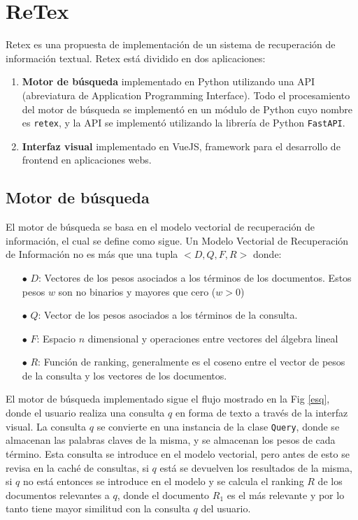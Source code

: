 \section{ReTex}

Retex es una propuesta de implementación de un sistema de recuperación de información textual. Retex está dividido en dos aplicaciones: 

\begin{enumerate}
    \item \textbf{Motor de búsqueda} implementado en Python utilizando una API (abreviatura de Application Programming Interface). Todo el procesamiento del motor de búsqueda se implementó en un módulo de Python cuyo nombre es \verb|retex|, y la API se implementó utilizando la librería de Python \verb|FastAPI|.
    \item \textbf{Interfaz visual} implementado en VueJS, framework para el desarrollo de frontend en aplicaciones webs.
\end{enumerate}

\subsection{Motor de búsqueda}

El motor de búsqueda se basa en el modelo vectorial de recuperación de información, el cual se define como sigue. Un Modelo Vectorial de Recuperación de Información \cite{manning} no es más que una tupla $<D, Q, F, R>$ donde:

\begin{enumerate}
    \item[$\bullet$] $D$: Vectores de los pesos asociados a los términos  de los documentos. Estos pesos $w$ son no binarios y mayores que cero ($w > 0$)
    \item[$\bullet$] $Q$: Vector de los pesos asociados a los términos de la consulta.
    \item[$\bullet$] $F$: Espacio $n$ dimensional y operaciones entre vectores del álgebra lineal
    \item[$\bullet$] $R$: Función de ranking, generalmente es el coseno entre el vector de pesos de la consulta y los vectores de los documentos.
\end{enumerate}

El motor de búsqueda implementado sigue el flujo mostrado en la Fig \ref{esq}, donde el usuario realiza una consulta $q$ en forma de texto a través de la interfaz visual. La consulta $q$ se convierte en una instancia de la clase \verb|Query|, donde se almacenan las palabras claves de la misma, y se almacenan los pesos de cada término. Esta consulta se introduce en el modelo vectorial, pero antes de esto se revisa en la caché de consultas, si $q$ está se devuelven los resultados de la misma, si $q$ no está entonces se introduce en el modelo y se calcula el ranking $R$ de los documentos relevantes a $q$, donde el documento $R_1$  es el más relevante y por lo tanto tiene mayor similitud con la consulta $q$ del usuario.

